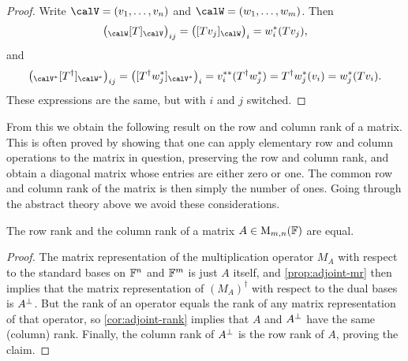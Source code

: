 \begin{proof}
    Write $\calV = (v_1, \ldots, v_n)$ and $\calW = (w_1, \ldots, w_m)$. Then
    \begin{equation*}
        \bigl( \mr{\calW}{T}{\calV} \bigr)_{ij}
            = \bigl( \coordvec{Tv_j}{\calW} \bigr)_i
            = w_i^*(Tv_j),
    \end{equation*}
    and
    \begin{equation*}
        \bigl( \mr{\calV^*}{T^\dagger}{\calW^*} \bigr)_{ij}
            = \bigl( \coordvec{T^\dagger w_j^*}{\calV^*} \bigr)_i
            = v_i^{**}(T^\dagger w_j^*)
            = T^\dagger w_j^*(v_i)
            = w_j^*(Tv_i).
    \end{equation*}
    These expressions are the same, but with $i$ and $j$ switched.
\end{proof}

From this we obtain the following result on the row and column rank of a matrix. This is often proved by showing that one can apply elementary row and column operations to the matrix in question, preserving the row and column rank, and obtain a diagonal matrix whose entries are either zero or one. The common row and column rank of the matrix is then simply the number of ones. Going through the abstract theory above we avoid these considerations.

\begin{corollary}
    The row rank and the column rank of a matrix $A \in \mathrm{M}_{m,n}(\mathbb{F})$ are equal.
\end{corollary}

\begin{proof}
    The matrix representation of the multiplication operator $M_A$ with respect to the standard bases on $\mathbb{F}^n$ and $\mathbb{F}^m$ is just $A$ itself, and \cref{prop:adjoint-mr} then implies that the matrix representation of $(M_A)^\dagger$ with respect to the dual bases is $A^\bot$. But the rank of an operator equals the rank of any matrix representation of that operator, so \cref{cor:adjoint-rank} implies that $A$ and $A^\bot$ have the same (column) rank. Finally, the column rank of $A^\bot$ is the row rank of $A$, proving the claim.
\end{proof}



